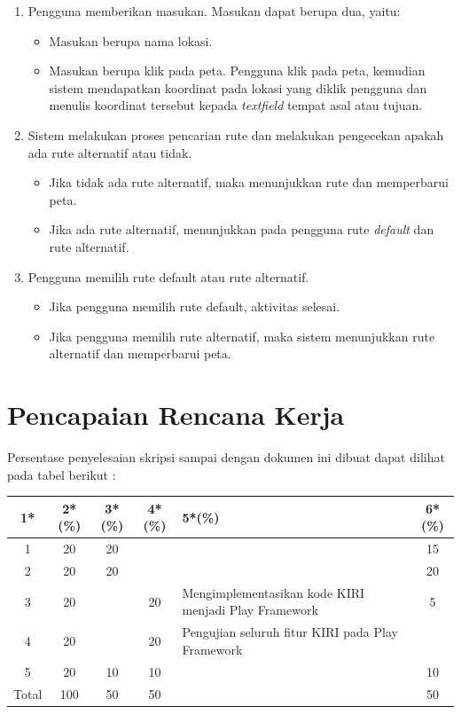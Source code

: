\documentclass[a4paper,twoside]{article}
\begin{document}
\begin{enumerate}
	\item Pengguna memberikan masukan. Masukan dapat berupa dua, yaitu:
	\begin{itemize}
		\item Masukan berupa nama lokasi.
		\item Masukan berupa klik pada peta. Pengguna klik pada peta, kemudian sistem mendapatkan koordinat pada lokasi yang diklik pengguna dan menulis koordinat tersebut kepada \textit{textfield} tempat asal atau tujuan.
	\end{itemize}
	\item Sistem melakukan proses pencarian rute dan melakukan pengecekan apakah ada rute alternatif atau tidak.
	\begin{itemize}
		\item Jika tidak ada rute alternatif, maka menunjukkan rute dan memperbarui peta.
		\item Jika ada rute alternatif, menunjukkan pada pengguna rute \textit{default} dan rute alternatif.
	\end{itemize}
	\item Pengguna memilih rute default atau rute alternatif.
	\begin{itemize}
		\item Jika pengguna memilih rute default, aktivitas selesai.
		\item Jika pengguna memilih rute alternatif, maka sistem menunjukkan rute alternatif dan memperbarui peta.
	\end{itemize}
\end{enumerate}





\section{Pencapaian Rencana Kerja}
Persentase penyelesaian skripsi sampai dengan dokumen ini dibuat dapat dilihat pada tabel berikut :

\begin{center}
  \begin{tabular}{ | c | c | c | c | l | c |}
    \hline
    1*  & 2*(\%) & 3*(\%) & 4*(\%) &5*(\%) & 6*(\%) \\ \hline \hline
    1   & 20  & 20  &  & & 15 \\ \hline
    2   & 20 & 20  &   & & 20\\ \hline
    3   & 20  &   & 20 & {\footnotesize Mengimplementasikan kode KIRI menjadi Play Framework} & 5 \\ \hline
    4   & 20  &   &  20 & {\footnotesize Pengujian seluruh fitur KIRI pada Play Framework} & \\ \hline
    5   & 20  & 10  & 10 & &10 \\ \hline
    Total  & 100  & 50  & 50 & & 50 \\ \hline
                          \end{tabular}
\end{center}
\end{document}
